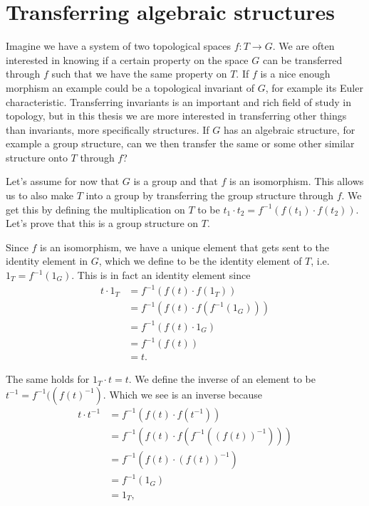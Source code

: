 

\section{Transferring algebraic structures}

Imagine we have a system of two topological spaces $f:T\longrightarrow G$. We are often interested in knowing if a certain property on the space $G$ can be transferred through $f$ such that we have the same property on $T$. If $f$ is a nice enough morphism an example could be a topological invariant of $G$, for example its Euler characteristic. Transferring invariants is an important and rich field of study in topology, but in this thesis we are more interested in transferring other things than invariants, more specifically structures. If $G$ has an algebraic structure, for example a group structure, can we then transfer the same or some other similar structure onto $T$ through $f$?

Let's assume for now that $G$ is a group and that $f$ is an isomorphism. This allows us to also make $T$ into a group by transferring the group structure through $f$. We get this by defining the multiplication on $T$ to be $t_1\cdot t_2 = f^{-1}(f(t_1)\cdot f(t_2))$. Let's prove that this is a group structure on $ T$. 

Since $ f$ is an isomorphism, we have a unique element that gets sent to the identity element in $ G$, which we define to be the identity element of $ T$, i.e. $ 1_T = f^{-1}(1_G)$. This is in fact an identity element since
\begin{align*} 
t\cdot 1_T &= f^{-1}(f(t)\cdot f(1_T)) \\ 
&= f^{-1}(f(t)\cdot f(f^{-1}(1_G))) \\ 
&= f^{-1}(f(t)\cdot 1_G) \\ 
&= f^{-1}(f(t)) \\ 
&= t . 
\end{align*}

 
The same holds for $ 1_T\cdot t = t$. We define the inverse of an element to be $ t^{-1} = f^{-1}((f(t)^{-1})$. Which we see is an inverse because
\begin{align*} 
t\cdot t^{-1} 
&= f^{-1}(f(t)\cdot f(t^{-1})) \\ 
&= f^{-1}(f(t)\cdot f(f^{-1}((f(t))^{-1}))) \\ 
&= f^{-1}(f(t)\cdot (f(t))^{-1}) \\ 
&= f^{-1}(1_G) \\ 
&= 1_T, 
\end{align*}


